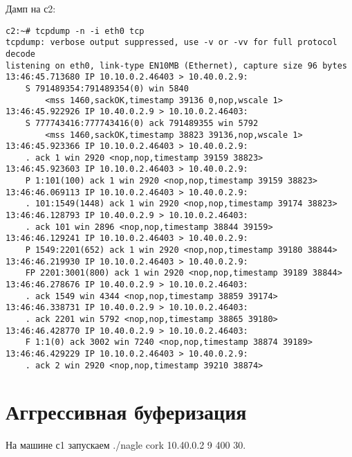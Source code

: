 \documentclass[a4paper,12pt]{article}
\begin{document}
Дамп на с2:
\begin{Verbatim}
c2:~# tcpdump -n -i eth0 tcp
tcpdump: verbose output suppressed, use -v or -vv for full protocol decode
listening on eth0, link-type EN10MB (Ethernet), capture size 96 bytes
13:46:45.713680 IP 10.10.0.2.46403 > 10.40.0.2.9: 
    S 791489354:791489354(0) win 5840 
        <mss 1460,sackOK,timestamp 39136 0,nop,wscale 1>
13:46:45.922926 IP 10.40.0.2.9 > 10.10.0.2.46403: 
    S 777743416:777743416(0) ack 791489355 win 5792 
        <mss 1460,sackOK,timestamp 38823 39136,nop,wscale 1>
13:46:45.923366 IP 10.10.0.2.46403 > 10.40.0.2.9: 
    . ack 1 win 2920 <nop,nop,timestamp 39159 38823>
13:46:45.923603 IP 10.10.0.2.46403 > 10.40.0.2.9: 
    P 1:101(100) ack 1 win 2920 <nop,nop,timestamp 39159 38823>
13:46:46.069113 IP 10.10.0.2.46403 > 10.40.0.2.9: 
    . 101:1549(1448) ack 1 win 2920 <nop,nop,timestamp 39174 38823>
13:46:46.128793 IP 10.40.0.2.9 > 10.10.0.2.46403: 
    . ack 101 win 2896 <nop,nop,timestamp 38844 39159>
13:46:46.129241 IP 10.10.0.2.46403 > 10.40.0.2.9: 
    P 1549:2201(652) ack 1 win 2920 <nop,nop,timestamp 39180 38844>
13:46:46.219930 IP 10.10.0.2.46403 > 10.40.0.2.9: 
    FP 2201:3001(800) ack 1 win 2920 <nop,nop,timestamp 39189 38844>
13:46:46.278676 IP 10.40.0.2.9 > 10.10.0.2.46403: 
    . ack 1549 win 4344 <nop,nop,timestamp 38859 39174>
13:46:46.338731 IP 10.40.0.2.9 > 10.10.0.2.46403: 
    . ack 2201 win 5792 <nop,nop,timestamp 38865 39180>
13:46:46.428770 IP 10.40.0.2.9 > 10.10.0.2.46403: 
    F 1:1(0) ack 3002 win 7240 <nop,nop,timestamp 38874 39189>
13:46:46.429229 IP 10.10.0.2.46403 > 10.40.0.2.9: 
    . ack 2 win 2920 <nop,nop,timestamp 39210 38874>
\end{Verbatim}

\section{Аггрессивная буферизация}

На машине с1 запускаем ./nagle cork 10.40.0.2 9 400 30.
\end{document}
